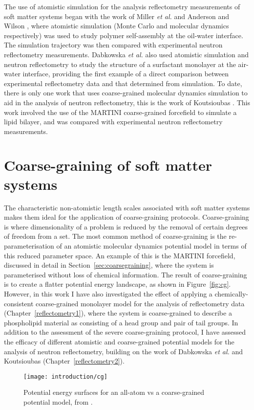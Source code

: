 The use of atomistic simulation for the analysis reflectometry measurements of soft matter systems began with the work of Miller \emph{et al.} and Anderson and Wilson \cite{miller_monte_2003,anderson_molecular_2004}, where atomistic simulation (Monte Carlo and molecular dynamics respectively) was used to study polymer self-assembly at the oil-water interface.
The simulation trajectory was then compared with experimental neutron reflectometry measurements.
Dabkowska \emph{et al.} also used atomistic simulation and neutron reflectometry to study the structure of a surfactant monolayer at the air-water interface, providing the first example of a direct comparison between experimental reflectometry data and that determined from simulation.
To date, there is only one work that uses coarse-grained molecular dynamics simulation to aid in the analysis of neutron reflectometry, this is the work of Koutsioubas \cite{koutsioubas_combined_2016}.
This work involved the use of the MARTINI coarse-grained forcefield to simulate a lipid bilayer, and was compared with experimental neutron reflectometry measurements.

\section{Coarse-graining of soft matter systems}

The characteristic non-atomistic length scales associated with soft matter systems makes them ideal for the application of coarse-graining protocols.
Coarse-graining is where dimensionality of a problem is reduced by the removal of certain degrees of freedom from a set.
The most common method of coarse-graining is the re-parameterisation of an atomistic molecular dynamics potential model in terms of this reduced parameter space.
An example of this is the MARTINI forcefield, discussed in detail in Section~\ref{sec:coarsegraining}, where the system is parameterised without loss of chemical information.
The result of coarse-graining is to create a flatter potential energy landscape, as shown in Figure~\ref{fig:cg}.
However, in this work I have also investigated the effect of applying a chemically-consistent coarse-grained monolayer model for the analysis of reflectometry data (Chapter~\ref{reflectometry1}), where the system is coarse-grained to describe a phospholipid material as consisting of a head group and pair of tail groups.
In addition to the assessment of the severe coarse-graining protocol, I have assessed the efficacy of different atomistic and coarse-grained potential models for the analysis of neutron reflectometry, building on the work of Dabkowska \emph{et al.} and Koutsioubas \cite{koutsioubas_combined_2016} (Chapter~\ref{reflectometry2}).
%
\begin{figure}
    \centering
    \texttt{[image: introduction/cg]}
    \caption{Potential energy surfaces for an all-atom vs a coarse-grained potential model, from \cite{kmiecik_coarse-grained_2016}.}
    \label{fig:pack}
\end{figure}
%

